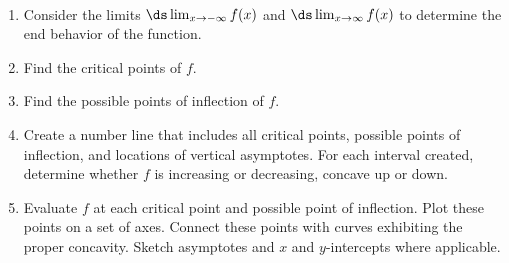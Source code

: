 {\addtocounter{keyideaEnv}{-1}
{~\\[-2\baselineskip]
\hspace{0pt}\begin{enumerate}[resume=curvesketching] %
	\item	Consider the limits $\ds\lim_{x\to-\infty}f(x)$ and $\ds\lim_{x\to\infty}f(x)$ to determine the end behavior of the function.
	\item	Find the critical points of $f$.
	\item	Find the possible points of inflection of $f$.
	\item	Create a number line that includes all critical points, possible points of inflection, and locations of vertical asymptotes. For each interval created, determine whether $f$ is increasing or decreasing, concave up or down.
	\item	Evaluate $f$ at each critical point and possible point of inflection. Plot these points on a set of axes. Connect these points with curves exhibiting the proper concavity. Sketch asymptotes and $x$ and $y$-intercepts where applicable.
\end{enumerate}}%
}


